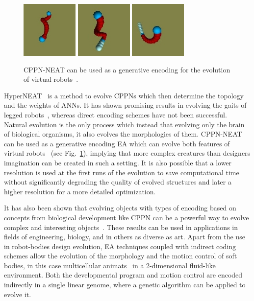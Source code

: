 \begin{figure}[t!]
\centering
\includegraphics[width=0.25\textwidth,height=0.2\textwidth]{../Figures/Misc/auerbach1.png}
\includegraphics[width=0.25\textwidth,height=0.2\textwidth]{../Figures/Misc/auerbach2.png}
\includegraphics[width=0.25\textwidth,height=0.2\textwidth]{../Figures/Misc/auerbach3.png}
\caption{CPPN-NEAT can be used as a generative encoding for the evolution of virtual robots~\citep{auerbach2010dynamic}.}
\label{fig:auerbach}
\end{figure}

HyperNEAT~\citep{stanley2009hypercube} is a method to evolve CPPNs which then determine the topology and the weights of ANNs. It has shown promising results in evolving the gaits of legged robots~\citep{clune2009evolving}, whereas direct encoding schemes have not been successful. Natural evolution is the only process which instead that evolving only the brain of biological organisms, it also evolves the morphologies of them. CPPN-NEAT~\citep{stanley2007compositional} can be used as a generative encoding EA which can evolve both features of virtual robots~\citep{auerbach2010dynamic, auerbach2010evolving} (see Fig.~\ref{fig:auerbach}), implying that more complex creatures than designers imagination can be created in such a setting. It is also possible that a lower resolution is used at the first runs of the evolution to save computational time without significantly degrading the quality of evolved structures and later a higher resolution for a more detailed optimization.

It has also been shown that evolving objects with types of encoding based on concepts from biological development like CPPN can be a powerful way to evolve complex and interesting objects~\citep{clune2011evolving}. These results can be used in applications in fields of engineering, biology, and in others as diverse as art. Apart from the use in robot-bodies design evolution, EA techniques coupled with indirect coding schemes allow the evolution of the morphology and the motion control of soft bodies, in this case  multicellular animats~\citep{joachimczak2012co} in a 2-dimensional fluid-like environment. Both the developmental program and motion control are encoded indirectly in a single linear genome, where a genetic algorithm can be applied to evolve it.

